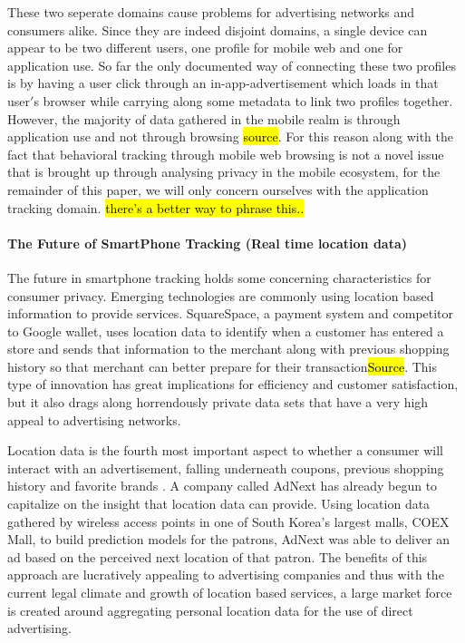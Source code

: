 
These two seperate domains cause problems for advertising networks and consumers alike. Since they are indeed disjoint domains, a single device can appear to be two different users, one profile for mobile web and one for application use. So far the only documented way of connecting these two profiles is by having a user click through an in-app-advertisement which loads in that user$'$s browser while carrying along some metadata to link two profiles together\cite{Trust2013b}. 
However, the majority of data gathered in the mobile realm is through application use and not through browsing \hl{source}. For this reason along with the fact that behavioral tracking through mobile web browsing is not a novel issue that is brought up through analysing privacy in the mobile ecosystem, for the remainder of this paper, we will only concern ourselves with the application tracking domain. \hl{there's a better way to phrase this..} 

		\paragraph{The Future of SmartPhone Tracking (Real time location data)}
The future in smartphone tracking holds some concerning characteristics for consumer privacy. Emerging technologies are commonly using location based information to provide services. SquareSpace, a payment system and competitor to Google wallet, uses location data to identify when a customer has entered a store and sends that information to the merchant along with previous shopping history so that merchant can better prepare for their transaction\hl{Source}. This type of innovation has great implications for efficiency and customer satisfaction, but it also drags along horrendously private data sets that have a very high appeal to advertising networks.

Location data is the fourth most important aspect to whether a consumer will interact with an advertisement, falling underneath coupons, previous shopping history and favorite brands \cite{Abi2012}. A company called AdNext has already begun to capitalize on the insight that location data can provide. Using location data gathered by wireless access points in one of South Korea’s largest malls, COEX Mall, to build prediction models for the patrons, AdNext was able to deliver an ad based on the perceived next location of that patron\cite{adn2012}. The benefits of this approach are lucratively appealing to advertising companies and thus with the current legal climate and growth of location based services, a large market force is created around aggregating personal location data for the use of direct advertising.

